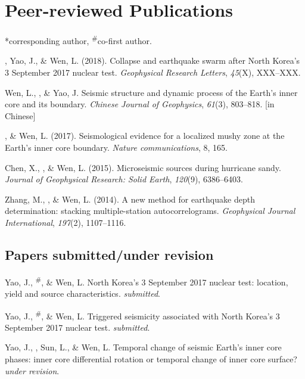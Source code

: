 \newcommand{\Submitted}{\textit{submitted}}
\newcommand{\Revision}{\textit{under revision}}
\newcommand{\CS}{*} %
\newcommand{\CF}{\textsuperscript{\#}} %

\section*{Peer-reviewed Publications}
\CS corresponding author, \CF co-first author.

\begin{etaremune}
\item
    \Tian\CS, Yao, J., \& Wen, L. (2018).
    Collapse and earthquake swarm after North Korea's 3 September 2017 nuclear test.
    \textit{Geophysical Research Letters}, \textit{45}(X), XXX--XXX.
\item
    Wen, L., \Tian, \& Yao, J.
    Seismic structure and dynamic process of the Earth's inner core and its boundary.
    \textit{Chinese Journal of Geophysics}, \textit{61}(3), 803--818.
     [in Chinese]
\item
    \Tian, \& Wen, L. (2017).
    Seismological evidence for a localized mushy zone at the Earth's inner core boundary.
    \textit{Nature communications}, 8, 165.
\item
    Chen, X., \Tian, \& Wen, L. (2015).
    Microseismic sources during hurricane sandy.
    \textit{Journal of Geophysical Research: Solid Earth}, \textit{120}(9), 6386--6403.
\item Zhang, M., \Tian, \& Wen, L. (2014).
    A new method for earthquake depth determination: stacking multiple-station autocorrelograms.
    \textit{Geophysical Journal International}, \textit{197}(2), 1107--1116.\\
\end{etaremune}

\subsection*{Papers submitted/under revision}
\begin{etaremune}
\item
    Yao, J., \Tian\CF, \& Wen, L.
	North Korea's 3 September 2017 nuclear test: location, yield and source characteristics.
    \Submitted.
\item
    Yao, J., \Tian\CF, \& Wen, L.
	Triggered seismicity associated with North Korea's 3 September 2017 nuclear test.
    \Submitted.
\item
    Yao, J., \Tian, Sun, L., \& Wen, L.
    Temporal change of seismic Earth's inner core phases: inner core differential rotation or temporal change of inner core surface?
    \Revision.
\end{etaremune}

